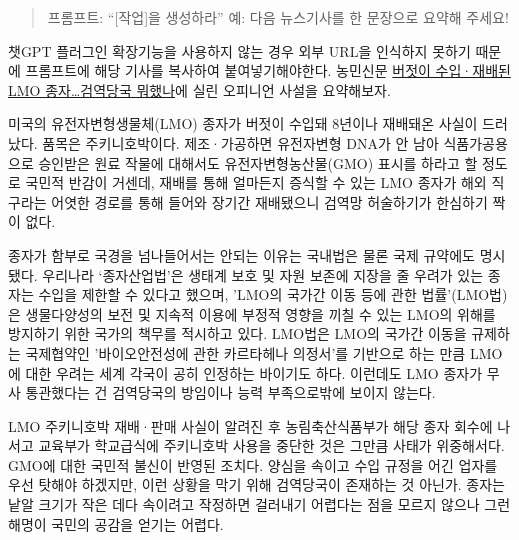\documentclass[
  letterpaper,
]{book}
\begin{document}
\begin{quote}
프롬프트: ``{[}작업{]}을 생성하라'' 예: 다음 뉴스기사를 한 문장으로
요약해 주세요!
\end{quote}

챗GPT 플러그인 확장기능을 사용하지 않는 경우 외부 URL을 인식하지 못하기
때문에 프롬프트에 해당 기사를 복사하여 붙여넣기해야한다. 농민신문
\href{https://www.nongmin.com/article/20230329500494}{버젓이 수입·재배된
LMO 종자\ldots 검역당국 뭐했나}에 실린 오피니언 사설을 요약해보자.

\begin{tcolorbox}[enhanced jigsaw, opacityback=0, opacitybacktitle=0.6, colback=white, rightrule=.15mm, coltitle=black, colframe=quarto-callout-note-color-frame, colbacktitle=quarto-callout-note-color!10!white, bottomrule=.15mm, bottomtitle=1mm, breakable, title=\textcolor{quarto-callout-note-color}{\faInfo}\hspace{0.5em}{프롬프트: 다음 뉴스기사를 한 문장으로 요약해 주세요!}, titlerule=0mm, leftrule=.75mm, toptitle=1mm, left=2mm, arc=.35mm, toprule=.15mm]

미국의 유전자변형생물체(LMO) 종자가 버젓이 수입돼 8년이나 재배돼온
사실이 드러났다. 품목은 주키니호박이다. 제조·가공하면 유전자변형 DNA가
안 남아 식품가공용으로 승인받은 원료 작물에 대해서도
유전자변형농산물(GMO) 표시를 하라고 할 정도로 국민적 반감이 거센데,
재배를 통해 얼마든지 증식할 수 있는 LMO 종자가 해외 직구라는 어엿한
경로를 통해 들어와 장기간 재배됐으니 검역망 허술하기가 한심하기 짝이
없다.

종자가 함부로 국경을 넘나들어서는 안되는 이유는 국내법은 물론 국제
규약에도 명시됐다. 우리나라 `종자산업법'은 생태계 보호 및 자원 보존에
지장을 줄 우려가 있는 종자는 수입을 제한할 수 있다고 했으며, 'LMO의
국가간 이동 등에 관한 법률'(LMO법)은 생물다양성의 보전 및 지속적 이용에
부정적 영향을 끼칠 수 있는 LMO의 위해를 방지하기 위한 국가의 책무를
적시하고 있다. LMO법은 LMO의 국가간 이동을 규제하는 국제협약인
'바이오안전성에 관한 카르타헤나 의정서'를 기반으로 하는 만큼 LMO에 대한
우려는 세계 각국이 공히 인정하는 바이기도 하다. 이런데도 LMO 종자가 무사
통관했다는 건 검역당국의 방임이나 능력 부족으로밖에 보이지 않는다.

LMO 주키니호박 재배·판매 사실이 알려진 후 농림축산식품부가 해당 종자
회수에 나서고 교육부가 학교급식에 주키니호박 사용을 중단한 것은 그만큼
사태가 위중해서다. GMO에 대한 국민적 불신이 반영된 조치다. 양심을 속이고
수입 규정을 어긴 업자를 우선 탓해야 하겠지만, 이런 상황을 막기 위해
검역당국이 존재하는 것 아닌가. 종자는 낱알 크기가 작은 데다 속이려고
작정하면 걸러내기 어렵다는 점을 모르지 않으나 그런 해명이 국민의 공감을
얻기는 어렵다.


\end{tcolorbox}
\end{document}
